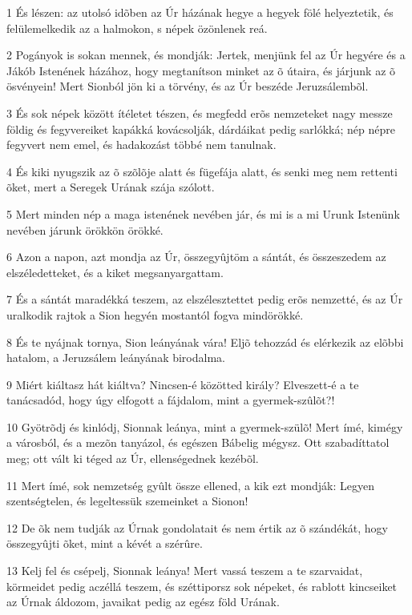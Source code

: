 \par 1 És lészen: az utolsó idõben az Úr házának hegye a hegyek fölé helyeztetik, és felülemelkedik az a halmokon, s népek özönlenek reá.
\par 2 Pogányok is sokan mennek, és mondják: Jertek, menjünk fel az Úr hegyére és a Jákób Istenének házához, hogy megtanítson minket az õ útaira, és járjunk az õ ösvényein! Mert Sionból jön ki a törvény, és az Úr beszéde Jeruzsálembõl.
\par 3 És sok népek között ítéletet tészen, és megfedd erõs nemzeteket nagy messze földig és fegyvereiket kapákká kovácsolják, dárdáikat pedig sarlókká; nép népre fegyvert nem emel, és hadakozást többé nem tanulnak.
\par 4 És kiki nyugszik az õ szõlõje alatt és fügefája alatt, és senki meg nem rettenti õket, mert a Seregek Urának szája szólott.
\par 5 Mert minden nép a maga istenének nevében jár, és mi is a mi Urunk Istenünk nevében járunk örökkön örökké.
\par 6 Azon a napon, azt mondja az Úr, összegyûjtöm a sántát, és összeszedem az elszéledetteket, és a kiket megsanyargattam.
\par 7 És a sántát maradékká teszem, az elszélesztettet pedig erõs nemzetté, és az Úr uralkodik rajtok a Sion hegyén mostantól fogva mindörökké.
\par 8 És te nyájnak tornya, Sion leányának vára! Eljõ tehozzád és elérkezik az elõbbi hatalom, a Jeruzsálem leányának birodalma.
\par 9 Miért kiáltasz hát kiáltva? Nincsen-é közötted király? Elveszett-é a te tanácsadód, hogy úgy elfogott a fájdalom, mint a gyermek-szûlõt?!
\par 10 Gyötrõdj és kinlódj, Sionnak leánya, mint a gyermek-szülõ! Mert ímé, kimégy a városból, és a mezõn tanyázol, és egészen Bábelig mégysz. Ott szabadíttatol meg; ott vált ki téged az Úr, ellenségednek  kezébõl.
\par 11 Mert ímé, sok nemzetség gyûlt össze ellened, a kik ezt mondják: Legyen szentségtelen, és legeltessük szemeinket a Sionon!
\par 12 De õk nem tudják az Úrnak gondolatait és nem értik az õ szándékát, hogy összegyûjti õket, mint a kévét a szérûre.
\par 13 Kelj fel és csépelj, Sionnak leánya! Mert vassá teszem a te szarvaidat, körmeidet pedig aczéllá teszem, és széttiporsz sok népeket, és rablott kincseiket az Úrnak áldozom, javaikat pedig az egész föld Urának.

